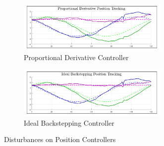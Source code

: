 \begin{figure}[htbp]
\centering
\begin{subfigure}{\textwidth}
\centering
\includegraphics[width=0.8\textwidth]{graphs/PD_Position_Trajectory_dist}
\caption{Proportional Derivative Controller}
\label{fig:app-position-pd-dist}
\end{subfigure}
\begin{subfigure}{\textwidth}
\centering
\includegraphics[width=0.8\textwidth]{graphs/IBC_Position_Trajectory_dist}
\caption{Ideal Backstepping Controller}
\label{fig:app-position-ibc-dist}
\end{subfigure}
\caption{Disturbances on Position Controllers}
\end{figure}